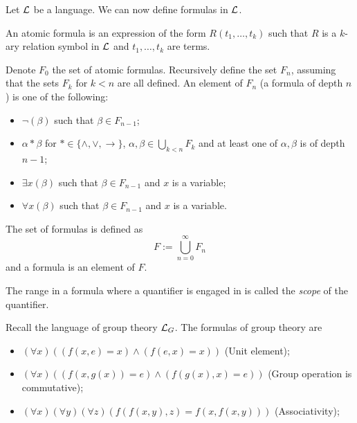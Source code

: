 \documentclass[11pt,a4paper]{article}
\renewcommand{\implies}{\rightarrow}
\begin{document}
Let $\mathcal{L}$ be a language. We can now define formulas in $\mathcal{L}$.

\begin{definition}
  An atomic formula is an expression of the form $R(t_1,\dots,t_k)$ such
  that $R$ is a $k$-ary relation symbol in $\mathcal{L}$ and $t_1,\dots,t_k$ are
  terms.



  



\end{definition}

\begin{definition}[Formula]
  Denote $F_0$ the set of atomic formulas.
  Recursively define the set $F_n$, assuming that the sets $F_k$ for $k < n$
  are all defined.
  An element of $F_n$ (a formula of depth $n$) is one of the following:
  \begin{itemize}
    \item $\neg (\beta)$ such that $\beta \in F_{n-1}$;
    \item $\alpha * \beta$ for $* \in \{\land, \lor, \implies\}$,
      $\alpha,\beta \in \bigcup_{k < n} F_k$ and at least one of 
      $\alpha,\beta$ is of depth $n-1$;
    \item $\exists x(\beta)$ such that $\beta \in F_{n-1}$ and $x$ is
      a variable;
    \item $\forall x(\beta)$ such that $\beta \in F_{n-1}$ and $x$ is
      a variable.
  \end{itemize}
  The set of formulas is defined as
  \[
    F := \bigcup_{n=0}^{\infty} F_n
  \]
  and a formula is an element of $F$.
\end{definition}

\begin{remark}
  The range in a formula where a quantifier is engaged in is called the
  \emph{scope} of the quantifier.
\end{remark}

\begin{example}
  Recall the language of group theory $\mathcal{L}_G$.
  The formulas of group theory are
  \begin{itemize}
    \item $(\forall x)((f(x,e) = x) \land (f(e,x) = x))$ (Unit element);
    \item $(\forall x)((f(x,g(x)) = e) \land (f(g(x),x) = e))$
      (Group operation is commutative);
    \item $(\forall x)(\forall y)(\forall z)
      (f(f(x,y),z) = f(x,f(x,y)))$ (Associativity);
  \end{itemize}
\end{example}
\end{document}
